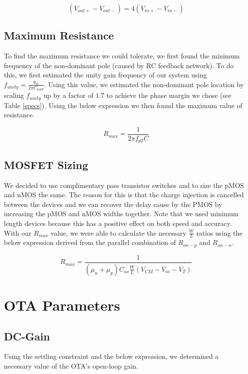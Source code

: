 \documentclass{article}
\begin{document}
\begin{equation}
\left(V_{out+}-V_{out-}\right) = 4\left(V_{in+}-V_{in-}\right)
\end{equation}

\subsection{Maximum Resistance}
To find the maximum resistance we could tolerate, we first found the minimum frequency of the non-dominant pole (caused by RC feedback network). To do this, we first estimated the unity gain frequency of our system using $f_{unity} = \frac{g_m}{2\pi C_{hold}}$. Using this value, we estimated the non-dominant pole location by scaling $f_{unity}$ up by a factor of $1.7$ to achieve the phase margin we chose (see Table \ref{specs}). Using the below expression we then found the maximum value of resistance.

\begin{equation}
R_{max} = \frac{1}{2 \pi f_{p2}C}
\end{equation}

\subsection{MOSFET Sizing}
We decided to use complimentary pass transistor switches and to size the pMOS and nMOS the same. The reason for this is that the charge injection is cancelled between the devices and we can recover the delay cause by the PMOS by increasing the pMOS and nMOS widths together. Note that we used minimum length devices because this has a positive effect on both speed and accuracy. With our $R_{max}$ value, we were able to calculate the necessary $\frac{W}{L}$ ratios using the below expression derived from the parallel combination of $R_{on-p}$ and $R_{on-n}$.

\begin{equation}
R_{max} = \frac{1}{(\mu_n + \mu_p) C_{ox} \frac{W}{L} (V_{CM} - V_{in} - V_T)}
\end{equation}

\section{OTA Parameters}
\subsection{DC-Gain}
Using the settling constraint and the below expression, we determined a necessary value of the OTA's open-loop gain.
\end{document}
